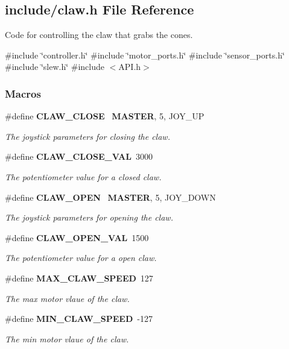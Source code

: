 \subsection{include/claw.h File Reference}
\label{claw_8h}


Code for controlling the claw that grabs the cones.  


{\ttfamily \#include \char`\"{}controller.\+h\char`\"{}}\newline
{\ttfamily \#include \char`\"{}motor\+\_\+ports.\+h\char`\"{}}\newline
{\ttfamily \#include \char`\"{}sensor\+\_\+ports.\+h\char`\"{}}\newline
{\ttfamily \#include \char`\"{}slew.\+h\char`\"{}}\newline
{\ttfamily \#include $<$A\+P\+I.\+h$>$}\newline
\subsubsection*{Macros}
\begin{DoxyCompactItemize}
\item 
\#define \textbf{ C\+L\+A\+W\+\_\+\+C\+L\+O\+SE}~\textbf{ M\+A\+S\+T\+ER}, 5, J\+O\+Y\+\_\+\+UP
\begin{DoxyCompactList}\small\item\em The joystick parameters for closing the claw. \end{DoxyCompactList}\item 
\#define \textbf{ C\+L\+A\+W\+\_\+\+C\+L\+O\+S\+E\+\_\+\+V\+AL}~3000
\begin{DoxyCompactList}\small\item\em The potentiometer value for a closed claw. \end{DoxyCompactList}\item 
\#define \textbf{ C\+L\+A\+W\+\_\+\+O\+P\+EN}~\textbf{ M\+A\+S\+T\+ER}, 5, J\+O\+Y\+\_\+\+D\+O\+WN
\begin{DoxyCompactList}\small\item\em The joystick parameters for opening the claw. \end{DoxyCompactList}\item 
\#define \textbf{ C\+L\+A\+W\+\_\+\+O\+P\+E\+N\+\_\+\+V\+AL}~1500
\begin{DoxyCompactList}\small\item\em The potentiometer value for a open claw. \end{DoxyCompactList}\item 
\#define \textbf{ M\+A\+X\+\_\+\+C\+L\+A\+W\+\_\+\+S\+P\+E\+ED}~127
\begin{DoxyCompactList}\small\item\em The max motor vlaue of the claw. \end{DoxyCompactList}\item 
\#define \textbf{ M\+I\+N\+\_\+\+C\+L\+A\+W\+\_\+\+S\+P\+E\+ED}~-\/127
\begin{DoxyCompactList}\small\item\em The min motor vlaue of the claw. \end{DoxyCompactList}\end{DoxyCompactItemize}
